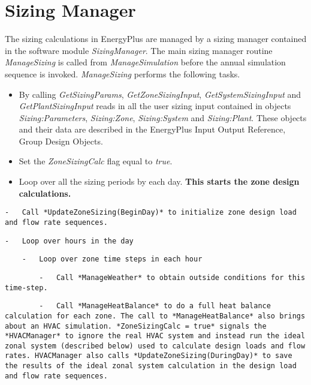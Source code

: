 \section{Sizing Manager}\label{sizing-manager}

The sizing calculations in EnergyPlus are managed by a sizing manager contained in the software module \emph{SizingManager}. The main sizing manager routine \emph{ManageSizing} is called from \emph{ManageSimulation} before the annual simulation sequence is invoked. \emph{ManageSizing} performs the following tasks.

\begin{itemize}
\item
  By calling \emph{GetSizingParams}, \emph{GetZoneSizingInput}, \emph{GetSystemSizingInput} and \emph{GetPlantSizingInput} reads in all the user sizing input contained in objects \emph{Sizing:Parameters}, \emph{Sizing:Zone}, \emph{Sizing:System} and \emph{Sizing:Plant}. These objects and their data are described in the EnergyPlus Input Output Reference, Group Design Objects.
\item
  Set the \emph{ZoneSizingCalc} flag equal to \emph{true}.
\item
  Loop over all the sizing periods by each day. \textbf{This starts the zone design calculations.}
\end{itemize}

\begin{lstlisting}
-   Call *UpdateZoneSizing(BeginDay)* to initialize zone design load and flow rate sequences.
\end{lstlisting}

\begin{lstlisting}
-   Loop over hours in the day
\end{lstlisting}

\begin{lstlisting}
    -   Loop over zone time steps in each hour
\end{lstlisting}

\begin{lstlisting}
        -   Call *ManageWeather* to obtain outside conditions for this time-step.
\end{lstlisting}

\begin{lstlisting}
        -   Call *ManageHeatBalance* to do a full heat balance calculation for each zone. The call to *ManageHeatBalance* also brings about an HVAC simulation. *ZoneSizingCalc = true* signals the *HVACManager* to ignore the real HVAC system and instead run the ideal zonal system (described below) used to calculate design loads and flow rates. HVACManager also calls *UpdateZoneSizing(DuringDay)* to save the results of the ideal zonal system calculation in the design load and flow rate sequences.
\end{lstlisting}

